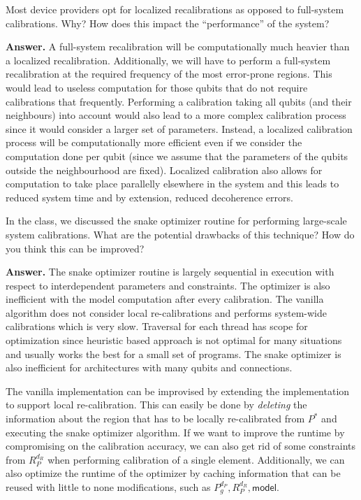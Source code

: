 \tcbline{}

\begin{question}
    Most device providers opt for localized recalibrations as opposed to full-system calibrations. Why? How does this impact the ``performance'' of the system?
\end{question}
\textbf{Answer.} A full-system recalibration will be computationally much heavier than a localized recalibration. Additionally, we will have to perform a full-system recalibration at the required frequency of the most error-prone regions. This would lead to useless computation for those qubits that do not require calibrations that frequently. Performing a calibration taking all qubits (and their neighbours) into account would also lead to a more complex calibration process since it would consider a larger set of parameters. Instead, a localized calibration process will be computationally more efficient even if we consider the computation done per qubit (since we assume that the parameters of the qubits outside the neighbourhood are fixed). Localized calibration also allows for computation to take place parallelly elsewhere in the system and this leads to reduced system time and by extension, reduced decoherence errors.

\tcbline{}

\begin{question}
    In the class, we discussed the snake optimizer routine for performing large-scale system calibrations. What are the potential drawbacks of this technique? How do you think this can be improved?
\end{question}
\textbf{Answer.} The snake optimizer routine is largely sequential in execution with respect to interdependent parameters and constraints. The optimizer is also inefficient with the model computation after every calibration. The vanilla algorithm does not consider local re-calibrations and performs system-wide calibrations which is very slow. Traversal for each thread has scope for optimization since heuristic based approach is not optimal for many situations and usually works the best for a small set of programs. The snake optimizer is also inefficient for architectures with many qubits and connections.\par
The vanilla implementation can be improvised by extending the implementation to support local re-calibration. This can easily be done by \textit{deleting} the information about the region that has to be locally re-calibrated from $P^*$ and executing the snake optimizer algorithm. If we want to improve the runtime by compromising on the calibration accuracy, we can also get rid of some constraints from $R_P^{d_R}$ when performing calibration of a single element. Additionally, we can also optimize the runtime of the optimizer by caching information that can be reused with little to none modifications, such as $P_g^{d_P}, R_P^{d_R}, \mathsf{model}$.